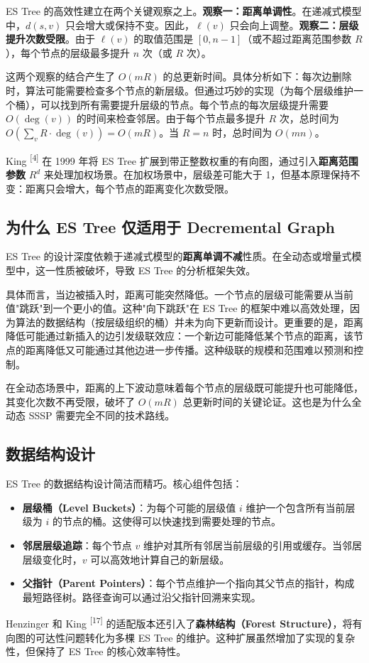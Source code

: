 \documentclass[12pt,a4paper]{ctexart}
\begin{document}
ES Tree 的高效性建立在两个关键观察之上。\textbf{观察一：距离单调性}。在递减式模型中，$d(s,v)$ 只会增大或保持不变。因此，$\ell(v)$ 只会向上调整。\textbf{观察二：层级提升次数受限}。由于 $\ell(v)$ 的取值范围是 $[0, n-1]$（或不超过距离范围参数 $R$），每个节点的层级最多提升 $n$ 次（或 $R$ 次）。

这两个观察的结合产生了 $O(mR)$ 的总更新时间。具体分析如下：每次边删除时，算法可能需要检查多个节点的新层级。但通过巧妙的实现（为每个层级维护一个桶），可以找到所有需要提升层级的节点。每个节点的每次层级提升需要 $O(\deg(v))$ 的时间来检查邻居。由于每个节点最多提升 $R$ 次，总时间为 $O(\sum_v R\cdot\deg(v))=O(mR)$。当 $R=n$ 时，总时间为 $O(mn)$。

King \textsuperscript{[4]}  在 1999 年将 ES Tree 扩展到带正整数权重的有向图，通过引入\textbf{距离范围参数} $R^d$ 来处理加权场景。在加权场景中，层级差可能大于 1，但基本原理保持不变：距离只会增大，每个节点的距离变化次数受限。

\subsection{为什么 ES Tree 仅适用于 Decremental Graph}

ES Tree 的设计深度依赖于递减式模型的\textbf{距离单调不减}性质。在全动态或增量式模型中，这一性质被破坏，导致 ES Tree 的分析框架失效。

具体而言，当边被插入时，距离可能突然降低。一个节点的层级可能需要从当前值"跳跃"到一个更小的值。这种"向下跳跃"在 ES Tree 的框架中难以高效处理，因为算法的数据结构（按层级组织的桶）并未为向下更新而设计。更重要的是，距离降低可能通过新插入的边引发级联效应：一个新边可能降低某个节点的距离，该节点的距离降低又可能通过其他边进一步传播。这种级联的规模和范围难以预测和控制。

在全动态场景中，距离的上下波动意味着每个节点的层级既可能提升也可能降低，其变化次数不再受限，破坏了 $O(mR)$ 总更新时间的关键论证。这也是为什么全动态 SSSP 需要完全不同的技术路线。

\subsection{数据结构设计}

ES Tree 的数据结构设计简洁而精巧。核心组件包括：

\begin{itemize}
\item \textbf{层级桶（Level Buckets）}：为每个可能的层级值 $i$ 维护一个包含所有当前层级为 $i$ 的节点的桶。这使得可以快速找到需要处理的节点。
\item \textbf{邻居层级追踪}：每个节点 $v$ 维护对其所有邻居当前层级的引用或缓存。当邻居层级变化时，$v$ 可以高效地计算自己的新层级。
\item \textbf{父指针（Parent Pointers）}：每个节点维护一个指向其父节点的指针，构成最短路径树。路径查询可以通过沿父指针回溯来实现。

\end{itemize}
Henzinger 和 King \textsuperscript{[17]}  的适配版本还引入了\textbf{森林结构（Forest Structure）}，将有向图的可达性问题转化为多棵 ES Tree 的维护。这种扩展虽然增加了实现的复杂性，但保持了 ES Tree 的核心效率特性。
\end{document}
